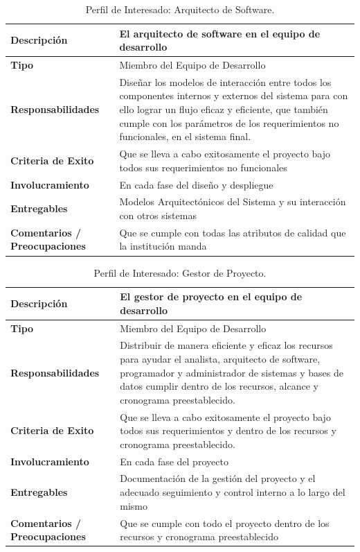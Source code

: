 \begin{table}[h!]
  \begin{tabular}{|p{}|p{}|}
    \hline
    \textbf{Descripción} & El arquitecto de software en el equipo de desarrollo \\
    \hline
    \textbf{Tipo} & Miembro del Equipo de Desarrollo \\
    \hline
    \textbf{Responsabilidades} & Diseñar los modelos de interacción entre todos los componentes internos y externos del sistema para con ello lograr un flujo eficaz y eficiente, que también cumple con los parámetros de los requerimientos no funcionales, en el sistema final. \\
    \hline
    \textbf{Criteria de Exito} & Que se lleva a cabo exitosamente el proyecto bajo todos sus requerimientos no funcionales \\
    \hline
    \textbf{Involucramiento} & En cada fase del diseño y despliegue \\
    \hline
    \textbf{Entregables} & Modelos Arquitectónicos del Sistema y su interacción con otros sistemas \\
    \hline
    \textbf{Comentarios / Preocupaciones} & Que se cumple con todas las atributos de calidad que la institución manda \\
    \hline
  \end{tabular}
  \caption{Perfil de Interesado: Arquitecto de Software.}
  \label{per-inter-arquitecto}
\end{table}

\pagebreak

\begin{table}[h!]
  \begin{tabular}{|p{}|p{}|}
    \hline
    \textbf{Descripción} & El gestor de proyecto en el equipo de desarrollo \\
    \hline
    \textbf{Tipo} & Miembro del Equipo de Desarrollo \\
    \hline
    \textbf{Responsabilidades} & Distribuir de manera eficiente y eficaz los recursos para ayudar el analista, arquitecto de software, programador y administrador de sistemas y bases de datos cumplir dentro de los recursos, alcance y cronograma preestablecido. \\
    \hline
    \textbf{Criteria de Exito} & Que se lleva a cabo exitosamente el proyecto bajo todos sus requerimientos y dentro de los recursos y cronograma preestablecido. \\
    \hline
    \textbf{Involucramiento} & En cada fase del proyecto \\
    \hline
    \textbf{Entregables} & Documentación de la gestión del proyecto y el adecuado seguimiento y control interno a lo largo del mismo \\
    \hline
    \textbf{Comentarios / Preocupaciones} & Que se cumple con todo el proyecto dentro de los recursos y cronograma preestablecido \\
    \hline
  \end{tabular}
  \caption{Perfil de Interesado: Gestor de Proyecto.}
  \label{per-inter-project-manager}
\end{table}

